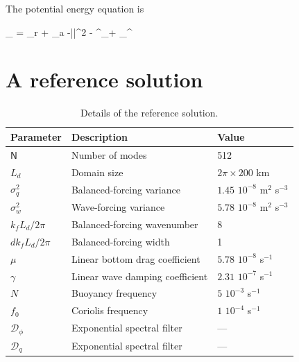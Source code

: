 \documentclass[12pt]{article}
\newcommand{\D}{\mathcal{D}}
\newcommand{\phis}{\phi^\star}
\renewcommand{\P}{\mathcal{P}}
\begin{document}
The potential energy equation  is

\beq
{} _{ \P} = \Gamma_r + \Gamma_a
 -\gamma \la |\nabla\phi|^2 \ra -  \la \lap\phis\D_\phi + \lap\phi\D_\phis \ra\per
\label{P}
\eeq

\section{A reference solution}

\begin{table}
 \begin{center}
   \caption{Details of the reference solution.}
   \label{parameters_reference}
   \begin{tabular}{ l | l | l }
     \hline
      Parameter & Description & Value \\
      \hline
      $\mathsf{N}$   & Number of modes &  512  \\
      $L_d$ & Domain size & $2\pi\times 200$ km \\
      $\sigma_q^2$ & Balanced-forcing variance & $1.45\,\,10^{-8}$ m$^2$ s$^{-3}$ \\
      $\sigma_w^2$ & Wave-forcing variance & $5.78\,\,10^{-8}$ m$^2$ s$^{-3}$ \\
      $k_f L_d/2\pi$    & Balanced-forcing wavenumber & 8 \\
      ${dk}_f L_d/2\pi$    & Balanced-forcing width &  1 \\
      $\mu$ & Linear bottom drag coefficient & $5.78\,\,10^{-8}$ s$^{-1}$ \\
      $\gamma$ & Linear wave damping coefficient & $2.31\,\,10^{-7}$ s$^{-1}$ \\
      $N$ & Buoyancy frequency &  $5\,\,10^{-3}$ s$^{-1}$\\
      $f_0$ & Coriolis frequency &  $1\,\,10^{-4}$ s$^{-1}$\\
      $\D_\phi$ & Exponential spectral filter & ---\\
      $\D_q$ & Exponential spectral filter & ---\\
   \end{tabular}
 \end{center}
\end{table}
\end{document}
